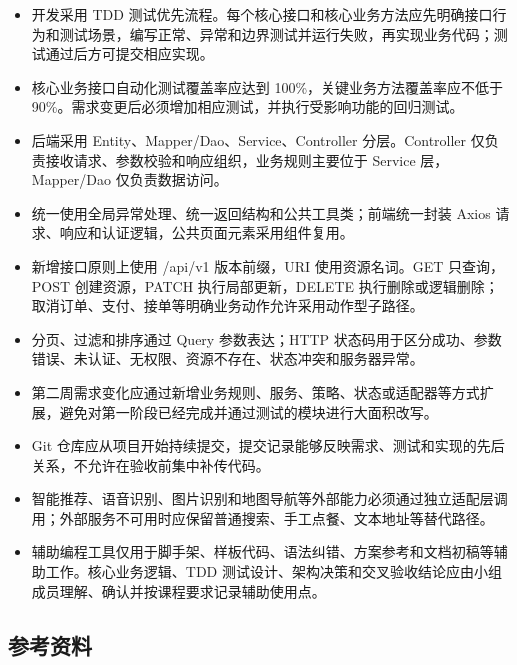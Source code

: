 \begin{itemize}
\item 开发采用 TDD 测试优先流程。每个核心接口和核心业务方法应先明确接口行为和测试场景，编写正常、异常和边界测试并运行失败，再实现业务代码；测试通过后方可提交相应实现。
\item 核心业务接口自动化测试覆盖率应达到 100\%，关键业务方法覆盖率应不低于 90\%。需求变更后必须增加相应测试，并执行受影响功能的回归测试。
\item 后端采用 Entity、Mapper/Dao、Service、Controller 分层。Controller 仅负责接收请求、参数校验和响应组织，业务规则主要位于 Service 层，Mapper/Dao 仅负责数据访问。
\item 统一使用全局异常处理、统一返回结构和公共工具类；前端统一封装 Axios 请求、响应和认证逻辑，公共页面元素采用组件复用。
\item 新增接口原则上使用 /api/v1 版本前缀，URI 使用资源名词。GET 只查询，POST 创建资源，PATCH 执行局部更新，DELETE 执行删除或逻辑删除；取消订单、支付、接单等明确业务动作允许采用动作型子路径。
\item 分页、过滤和排序通过 Query 参数表达；HTTP 状态码用于区分成功、参数错误、未认证、无权限、资源不存在、状态冲突和服务器异常。
\item 第二周需求变化应通过新增业务规则、服务、策略、状态或适配器等方式扩展，避免对第一阶段已经完成并通过测试的模块进行大面积改写。
\item Git 仓库应从项目开始持续提交，提交记录能够反映需求、测试和实现的先后关系，不允许在验收前集中补传代码。
\item 智能推荐、语音识别、图片识别和地图导航等外部能力必须通过独立适配层调用；外部服务不可用时应保留普通搜索、手工点餐、文本地址等替代路径。
\item 辅助编程工具仅用于脚手架、样板代码、语法纠错、方案参考和文档初稿等辅助工作。核心业务逻辑、TDD 测试设计、架构决策和交叉验收结论应由小组成员理解、确认并按课程要求记录辅助使用点。
\end{itemize}

\subsection{参考资料}

